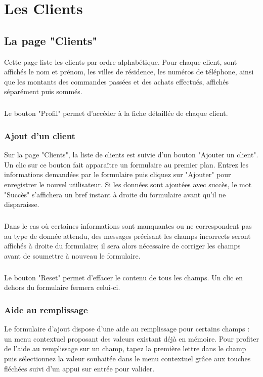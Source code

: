 \chapter{Les Clients}

\section{La page "Clients"}
Cette page liste les clients par ordre alphabétique. Pour chaque client, sont
affichés le nom et prénom, les villes de résidence, les numéros de téléphone, 
ainsi que les montants des commandes passées et des achats effectués, affichés
séparément puis sommés.

\paragraph{}
Le bouton "Profil" permet d'accéder à la fiche détaillée de chaque client.

\subsection{Ajout d'un client}
Sur la page "Clients", la liste de clients est suivie d'un bouton
"Ajouter un client". Un clic sur ce bouton fait apparaître un formulaire au
premier plan. Entrez les informations demandées par le formulaire puis cliquez
sur "Ajouter" pour enregistrer le nouvel utilisateur. Si les données sont
ajoutées avec succès, le mot "Succès" s'affichera un bref instant à droite du
formulaire avant qu'il ne disparaisse.

\paragraph{}
Dans le cas où certaines informations
sont manquantes ou ne correspondent pas au type de donnée attendu, des messages
précisant les champs incorrects seront affichés à droite du formulaire; il sera
alors nécessaire de corriger les champs avant de soumettre à nouveau le
formulaire.

\paragraph{}
Le bouton "Reset" permet d'effacer le contenu de tous les champs. Un clic en
dehors du formulaire fermera celui-ci.

\subsection{Aide au remplissage}
Le formulaire d'ajout dispose d'une aide au remplissage pour certains champs :
un menu contextuel proposant des valeurs existant déjà en mémoire. Pour profiter
de l'aide au remplissage sur un champ, tapez la première lettre dans le champ
puis sélectionnez la valeur souhaitée dans le menu contextuel grâce aux touches
fléchées suivi d'un appui sur entrée pour valider.

